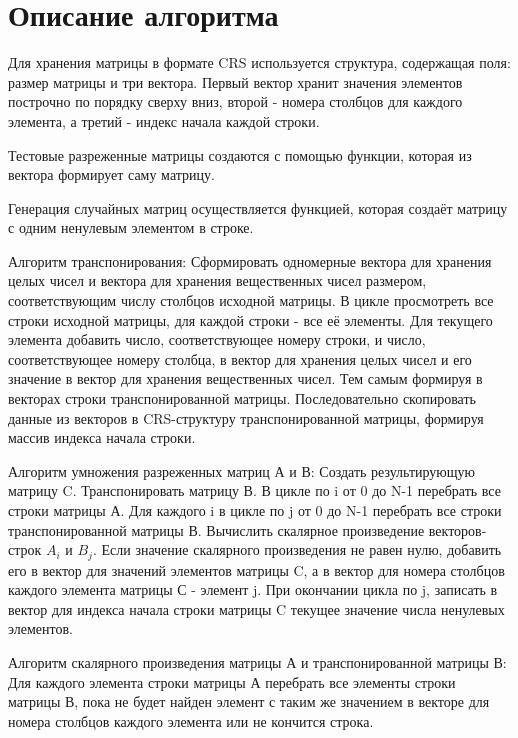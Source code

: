 \documentclass{report}
\begin{document}
\section* {Описание алгоритма}
Для хранения матрицы в формате CRS используется структура, содержащая поля: размер матрицы и три вектора. Первый вектор хранит значения элементов построчно по порядку сверху вниз, второй - номера столбцов для каждого элемента, а третий - индекс начала каждой строки.
\par
Тестовые разреженные матрицы создаются с помощью функции, которая из вектора формирует саму матрицу.
\par Генерация случайных матриц осуществляется функцией, которая создаёт матрицу с одним ненулевым элементом в строке.
\par Алгоритм транспонирования:
\newline{}\quad Сформировать одномерные вектора для хранения целых чисел и вектора для хранения вещественных чисел размером, соответствующим числу столбцов исходной матрицы. \newline{}\quad В цикле просмотреть все строки исходной матрицы, для каждой строки - все её элементы. Для текущего элемента добавить число, соответствующее номеру строки, и число, соответствующее номеру столбца, в вектор для хранения целых чисел и его значение в вектор для хранения вещественных чисел. Тем самым формируя в векторах строки транспонированной матрицы.
\newline{}\quad Последовательно скопировать данные из векторов в CRS-структуру транспонированной матрицы, формируя массив индекса начала строки.
\par Алгоритм умножения разреженных матриц А и В:
\newline{}\quad Создать результирующую матрицу C. \newline{}\quad Транспонировать матрицу В. \newline{}\quad В цикле по i от 0 до N-1 перебрать все строки матрицы А. Для каждого i в цикле по j от 0 до N-1 перебрать все строки транспонированной матрицы В. Вычислить скалярное произведение векторов-строк $A_i$ и $B_j$. Если значение скалярного произведения не равен нулю, добавить его в вектор для значений элементов матрицы C, а в вектор для номера столбцов каждого элемента матрицы С - элемент j. При окончании цикла по j, записать в вектор для индекса начала строки  матрицы C текущее значение числа ненулевых элементов.
\par Алгоритм скалярного произведения матрицы А и транспонированной матрицы В:
\newline Для каждого элемента строки матрицы А перебрать все элементы строки матрицы В, пока не будет найден элемент с таким же значением в векторе для номера столбцов каждого элемента или не кончится строка.
\newpage
\end{document}

